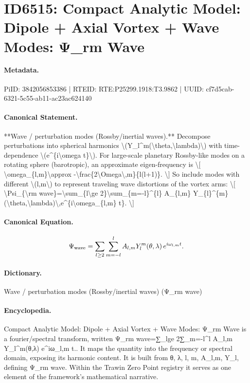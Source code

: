 \section*{ID6515: Compact Analytic Model: Dipole + Axial Vortex + Wave Modes: Ψ\_rm Wave}
\paragraph{Metadata.}
PiID: 3842056853386 | RTEID: RTE:P25299.1918:T3.9862 | UUID: cf7d5cab-6321-5c55-ab11-ac23ac624140

\paragraph{Canonical Statement.}
**Wave / perturbation modes (Rossby/inertial waves).** Decompose perturbations into spherical harmonics \textbackslash{}(Y\_l\textasciicircum{}m(\textbackslash{}theta,\textbackslash{}lambda)\textbackslash{}) with time-dependence \textbackslash{}(e\textasciicircum{}\{i\textbackslash{}omega t\}\textbackslash{}). For large-scale planetary Rossby-like modes on a rotating sphere (barotropic), an approximate eigen-frequency is \textbackslash{}[ \textbackslash{}omega\_\{l,m\}\textbackslash{}approx -\textbackslash{}frac\{2\textbackslash{}Omega\textbackslash{},m\}\{l(l+1)\}. \textbackslash{}] So include modes with different \textbackslash{}(l,m\textbackslash{}) to represent traveling wave distortions of the vortex arms: \textbackslash{}[ \textbackslash{}Psi\_\{\textbackslash{}rm wave\}=\textbackslash{}sum\_\{l\textbackslash{}ge 2\}\textbackslash{}sum\_\{m=-l\}\textasciicircum{}\{l\} A\_\{l,m\} Y\_\{l\}\textasciicircum{}\{m\}(\textbackslash{}theta,\textbackslash{}lambda)\textbackslash{},e\textasciicircum{}\{i\textbackslash{}omega\_\{l,m\} t\}. \textbackslash{}]

\paragraph{Canonical Equation.}
\[
\Psi_{\rm wave}=\sum_{l\ge 2}\sum_{m=-l}^{l} A_{l,m} Y_{l}^{m}(\theta,\lambda)\,e^{i\omega_{l,m} t}.
\]

\paragraph{Dictionary.}
Wave / perturbation modes (Rossby/inertial waves) (Ψ\_rm wave)

\paragraph{Encyclopedia.}
Compact Analytic Model: Dipole + Axial Vortex + Wave Modes: Ψ\_rm Wave is a fourier/spectral transform, written Ψ\_rm wave=∑\_lge 2∑\_m=-l\textasciicircum{}l A\_l,m Y\_l\textasciicircum{}m(θ,λ) e\textasciicircum{}iω\_l,m t.. It maps the quantity into the frequency or spectral domain, exposing its harmonic content. It is built from θ, λ, l, m, A\_l,m, Y\_l, defining Ψ\_rm wave. Within the Trawin Zero Point registry it serves as one element of the framework's mathematical narrative.
